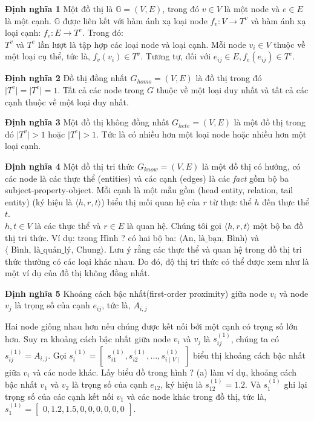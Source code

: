 \textbf{Định nghĩa 1} Một đồ thị là \(\mathbb{G} = (V, E)\), trong đó \(v \in V\) là một node và \(e \in E\) là một cạnh. \(\mathbb{G}\) được liên kết với hàm ánh xạ loại node \(f_v: V \to T^v\) và hàm ánh xạ loại cạnh: \(f_e: E \to T^e\). Trong đó: \\
\(T^v\) và \(T^e\) lần lượt là tập hợp các loại node và loại cạnh. Mỗi node \(v_i \in V\) thuộc về một loại cụ thể, tức là, \(f_v(v_i) \in T^v\). Tương tự, đối với \(e_{ij} \in E, f_e (e_{ij}) \in T^e\).

\textbf{Định nghĩa 2} Đồ thị đồng nhất $G_{homo} = (V, E)$ là đồ thị trong đó $\mid T^v \mid = \mid T^e \mid = 1$. Tất cả các node trong $G$ thuộc về một loại duy nhất và tất cả các cạnh thuộc về một loại duy nhất.

\textbf{Định nghĩa 3} Một đồ thị không đồng nhất $G_{hete} = (V, E)$ là một đồ thị trong đó $\mid T^v \mid > 1$ hoặc $\mid T^e \mid > 1$. Tức là có nhiều hơn một loại node hoặc nhiều hơn một loại cạnh.

\textbf{Định nghĩa 4} Một đồ thị tri thức $G_{know} = (V, E)$ là một đồ thị có hướng, có các node là các thực thể (entities) và các cạnh (edges) là các \textit{fact} gồm bộ ba subject-property-object. Mỗi cạnh là một mẫu gồm (head entity, relation, tail entity) (ký hiệu là $\langle h, r, t \rangle$) biểu thị mối quan hệ của $r$ từ thực thể $h$ đến thực thể $t$.\\
$h, t \in V$ là các thực thể và $r \in E$ là quan hệ. Chúng tôi gọi $\langle h, r, t \rangle$ một bộ ba đồ thị tri thức. Ví dụ: trong Hình ? có hai bộ ba: $\langle \text{An, là_bạn, Bình} \rangle$ và $\langle \text{ Bình, là_quản_lý, Chung} \rangle$. Lưu ý rằng các thực thể và quan hệ trong đồ thị tri thức thường có các loại khác nhau. Do đó, độ thị tri thức có thể được xem như là một ví dụ của đồ thị không đồng nhất.

\textbf{Định nghĩa 5} Khoảng cách bậc nhất(first-order proximity) giữa node  $v_i$ và node $v_j$ là trọng số của cạnh $e_{ij}$, tức là, $A_{i, j}$

Hai node giống nhau hơn nếu chúng được kết nối bởi một cạnh có trọng số lớn hơn. Suy ra khoảng cách bậc nhất giữa node $v_i$ và $v_j$ là $s^{(1)}_{ij}$, chúng ta có $s^{(1)}_{ij} = A_{i, j}$. Gọi $s^{(1)}_{i} = \begin{bmatrix} s^{(1)}_{i1}, s^{(1)}_{i2}, \dots, s^{(1)}_{i \mid V \mid} \end{bmatrix}$ biểu thị khoảng cách bậc nhất giữa \(v_i\) và các node khác. Lấy biểu đồ trong hình ? (a) làm ví dụ, khoảng cách bậc nhất $v_1$ và $v_2$ là trọng số của cạnh $e_{12}$, ký hiệu là $s^{(1)}_{12} = 1.2$. Và $s^{(1)}_1$ ghi lại trọng số của các cạnh kết nối $v_1$ và các node khác trong đồ thị, tức là, $s^{(1)}_{1} = \begin{bmatrix}  0, 1.2, 1.5, 0, 0, 0, 0, 0, 0 \end{bmatrix} $.

